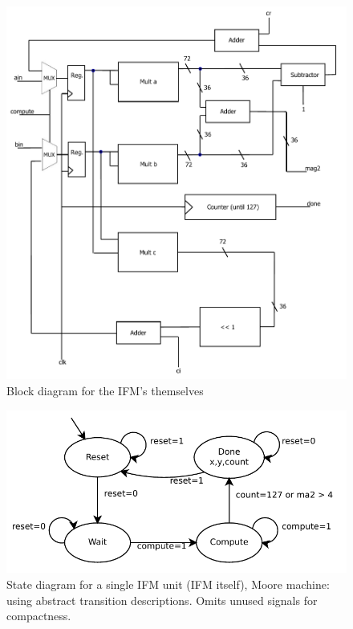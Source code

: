 \documentclass{article}
\begin{document}
\begin{figure}[h!]
  \centering
    \includegraphics[width=\textwidth]{block_diagrams/ifm.pdf}
  \caption{Block diagram for the IFM's themselves}
\end{figure}

\begin{figure}[h!]
  \centering
    \includegraphics[width=\textwidth]{state_diagrams/ifm.pdf}
  \caption{State diagram for a single IFM unit (IFM itself), Moore
    machine: using abstract transition descriptions. Omits unused
    signals for compactness.}
\end{figure}
\end{document}
